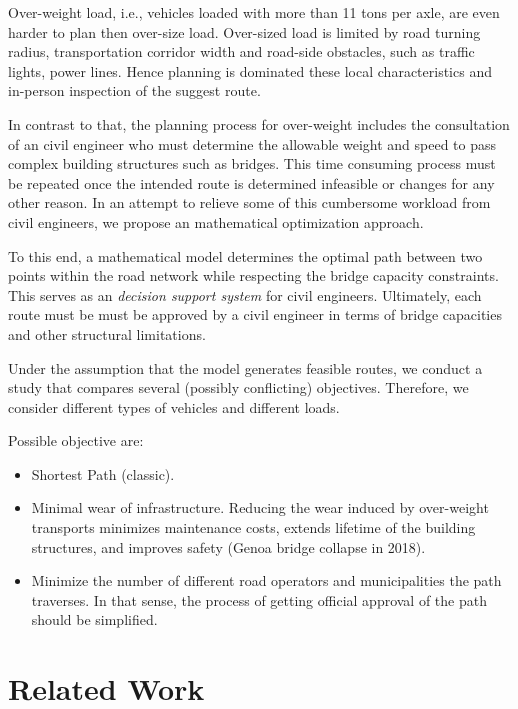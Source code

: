 

Over-weight load, i.e., vehicles loaded with more than 11 tons per axle,
are even harder to plan then over-size load. Over-sized load is limited
by road turning radius, transportation corridor width and road-side obstacles, such as traffic lights, power lines. Hence planning is dominated these local characteristics
and in-person inspection of the suggest route.

In contrast to that, the planning process for over-weight includes the consultation
of an civil engineer who must determine the allowable weight and speed to pass
complex building structures such as bridges.
This time consuming process must be repeated once the intended route is determined infeasible or changes for any other reason.
In an attempt to relieve some of this cumbersome workload from civil engineers,
we propose an mathematical optimization approach.

To this end, a mathematical model determines the optimal path between two
points within the road network while respecting the bridge capacity constraints.
This serves as an \textit{decision support system} for civil engineers.
Ultimately,  each route must be must be approved by a civil engineer  in terms of
bridge capacities and other structural limitations.

Under the assumption that the model generates feasible routes,
we conduct a study that compares several (possibly conflicting) objectives.
Therefore, we consider different types of vehicles and different loads.

Possible objective are:
\begin{itemize}
  \item Shortest Path (classic).

  \item Minimal wear of infrastructure. Reducing the wear induced by over-weight transports
  minimizes maintenance costs, extends lifetime of the building structures, and
  improves safety (Genoa bridge collapse in 2018).

  \item Minimize the number of different road operators and municipalities the path
  traverses. In that sense, the process of getting official approval of the
  path should be simplified.
\end{itemize}

\section{Related Work}

